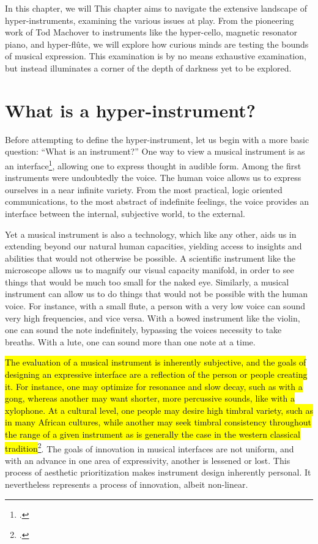 \documentclass[12pt,twoside,maitrise]{dms_ks}
\theoremstyle{definition}
\begin{document}
In this chapter, we will 
This chapter aims to navigate the extensive landscape of hyper-instruments, examining the various issues at play.
From the pioneering work of Tod Machover to instruments like the hyper-cello, magnetic resonator piano, and hyper-flûte, we will explore how curious minds are testing the bounds of musical expression.
This examination is by no means exhaustive examination, but instead illuminates a corner of the depth of darkness yet to be explored. 

\section{What is a hyper-instrument?}

Before attempting to define the hyper-instrument, let us begin with a more basic question: “What is an instrument?”
One way to view a musical instrument is as an interface\footcite{noauthor_instrument_nodate}, allowing one to express thought in audible form. 
Among the first instruments were undoubtedly the voice. 
The human voice allows us to express ourselves in a near infinite variety.
From the most practical, logic oriented communications, to the most abstract of indefinite feelings, the voice provides an interface between the internal, subjective world, to the external. 

Yet a musical instrument is also a technology, which like any other, aids us in extending beyond our natural human capacities, yielding access to insights and abilities that would not otherwise be possible. 
A scientific instrument like the microscope allows us to magnify our visual capacity manifold, in order to see things that would be much too small for the naked eye. 
Similarly, a musical instrument can allow us to do things that would not be possible with the human voice. 
For instance, with a small flute, a person with a very low voice can sound very high frequencies, and vice versa. 
With a bowed instrument like the violin, one can sound the note indefinitely, bypassing the voices necessity to take breaths. 
With a lute, one can sound more than one note at a time. 

\hl{The evaluation of a musical instrument is inherently subjective, and the goals of designing an expressive interface are a reflection of the person or people creating it. 
For instance, one may optimize for resonance and slow decay, such as with a gong, whereas another may want shorter, more percussive sounds, like with a xylophone. 
At a cultural level, one people may desire high timbral variety, such as in many African cultures, while another may seek timbral consistency throughout the range of a given instrument as is generally the case in the western classical tradition}\footcite[69]{fales_fusion_1994}.
The goals of innovation in musical interfaces are not uniform, and with an advance in one area of expressivity, another is lessened or lost. 
This process of aesthetic prioritization makes instrument design inherently personal. It nevertheless represents a process of innovation, albeit non-linear. 
\end{document}
